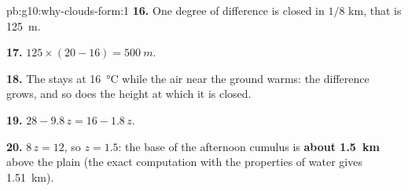 \begin{solution}{pb:g10:why-clouds-form:1}
\textbf{16.} One degree of difference is closed in $1/8$ km, that is
\qty{125}{m}.

\textbf{17.} $125 \times (20 - 16) = \qty{500}{m}$.

\textbf{18.} The  stays at \qty{16}{\degreeCelsius} while the air
near the ground warms: the difference grows, and so does the height at which
it is closed.

\textbf{19.} $28 - 9.8\,z = 16 - 1.8\,z$.

\textbf{20.} $8\,z = 12$, so $z = 1.5$: the base of the afternoon cumulus is
\textbf{about \qty{1.5}{km}} above the plain (the exact computation with the
properties of water gives \qty{1.51}{km}).
\end{solution}
